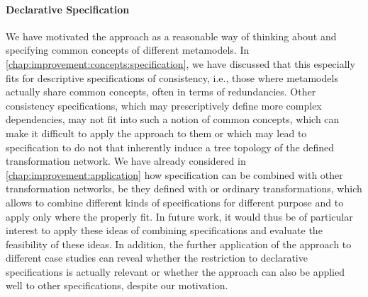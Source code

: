 \paragraph{Declarative Specification}
We have motivated the \commonalities approach as a reasonable way of thinking about and specifying common concepts of different metamodels.
In \autoref{chap:improvement:concepts:specification}, we have discussed that this especially fits for descriptive specifications of consistency, i.e., those where metamodels actually share common concepts, often in terms of redundancies.
Other consistency specifications, which may prescriptively define more complex dependencies, may not fit into such a notion of common concepts, which can make it difficult to apply the \commonalities approach to them or which may lead to specification to do not that inherently induce a tree topology of the defined transformation network.
We have already considered in \autoref{chap:improvement:application} how \commonalities specification can be combined with other transformation networks, be they defined with \commonalities or ordinary transformations, which allows to combine different kinds of specifications for different purpose and to apply \commonalities only where the properly fit.
In future work, it would thus be of particular interest to apply these ideas of combining specifications and evaluate the feasibility of these ideas.
In addition, the further application of the approach to different case studies can reveal whether the restriction to declarative specifications is actually relevant or whether the approach can also be applied well to other specifications, despite our motivation.


